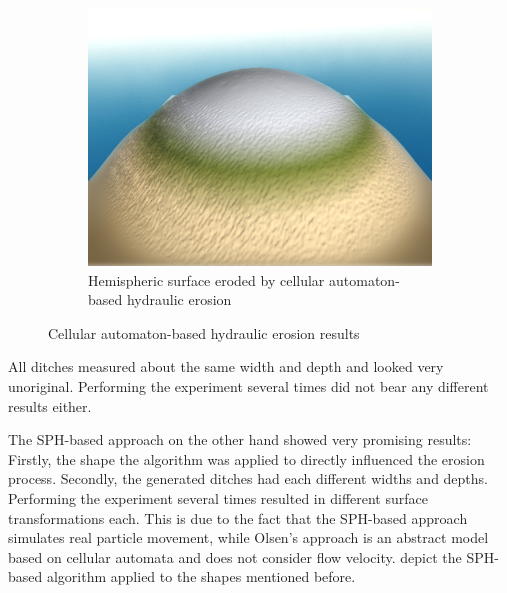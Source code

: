 \documentclass[11pt,a4paper,twoside,openright]{report}
\begin{document}
\begin{figure}[h]
\begin{subfigure}[b]{0.32\textwidth}
    \includegraphics[width=\textwidth]{hydro-10mins-46k-iterations-hemisphere.png}
    \caption{Hemispheric surface eroded by cellular automaton-based hydraulic erosion}
    \label{fig:hydro3}
  \end{subfigure}
  \caption{Cellular automaton-based hydraulic erosion results}
\end{figure}

\noindent All ditches measured about the same width and depth and looked very unoriginal. Performing the experiment several times did not bear any different results either.

The SPH-based approach on the other hand showed very promising results: Firstly, the shape the algorithm was applied to directly influenced the erosion process. Secondly, the generated ditches had each different widths and depths. Performing the experiment several times resulted in different surface transformations each. This is due to the fact that the SPH-based approach simulates real particle movement, while Olsen's approach is an abstract model based on cellular automata and does not consider flow velocity.  depict the SPH-based algorithm applied to the shapes mentioned before.
\end{document}

